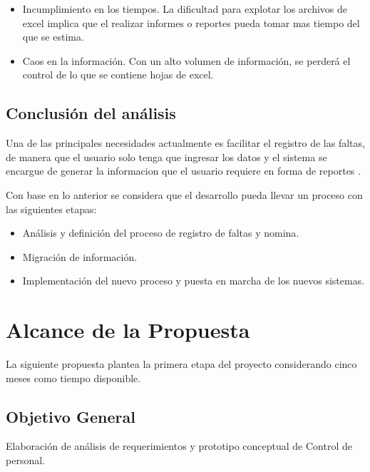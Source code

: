 \documentclass[10pt]{book}
\newcommand{\nombreProyecto}{ Control de personal}
\begin{document}
\begin{itemize}	
	\item Incumplimiento en los tiempos. La dificultad para explotar los archivos de excel implica que el realizar informes o reportes pueda tomar mas tiempo del que se estima.
	\item Caos en la información. Con un alto volumen de información, se perderá el control de lo que se contiene hojas de excel.
\end{itemize}


\section{Conclusión del análisis}
	
	Una de las principales necesidades actualmente es facilitar el registro de las faltas, de manera que el usuario solo tenga que ingresar los datos y el sistema se encargue de generar la informacion que el usuario requiere en forma de reportes .
		
	Con base en lo anterior se considera que el desarrollo pueda llevar un proceso con las siguientes etapas:
	
\begin{itemize}
	\item Análisis y definición del proceso de registro de faltas y nomina.
	\item Migración de información.
	\item Implementación del nuevo proceso y puesta en marcha de los nuevos sistemas.
\end{itemize}

\chapter{Alcance de la Propuesta}

	La siguiente propuesta plantea la primera etapa del proyecto considerando cinco meses como tiempo disponible.

\section{Objetivo General}

	Elaboración de análisis de requerimientos y prototipo conceptual de \nombreProyecto.
\end{document}
